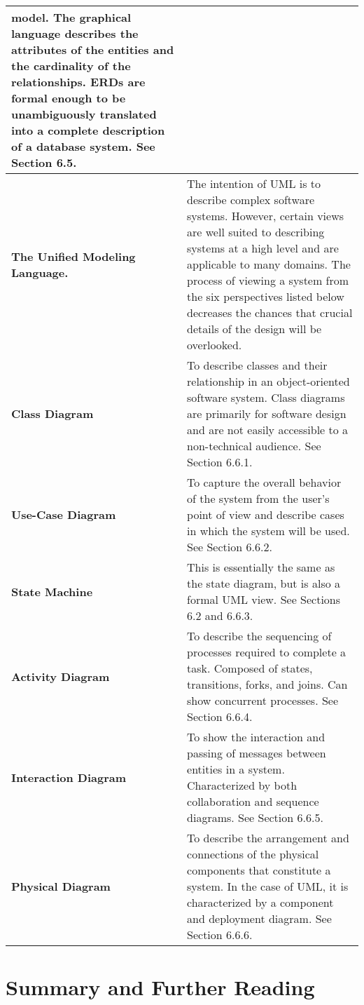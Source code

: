 \begin{table}
\begin{tabular}{|l|m{10cm}|}
model. The graphical language describes the attributes of the entities
and the cardinality of the relationships. ERDs are formal enough to be
unambiguously translated into a complete description of a database
system. See Section 6.5. \\  \hline
\textbf{The Unified Modeling Language.} & The intention of UML is to
describe complex software systems. However, certain views are well
suited to describing systems at a high level and are applicable to many
domains. The process of viewing a system from the six perspectives
listed below decreases the chances that crucial details of the design
will be overlooked. \\  \hline
\textbf{Class Diagram} & To describe classes and their relationship in
an object-oriented software system. Class diagrams are primarily for
software design and are not easily accessible to a non-technical
audience. See Section 6.6.1. \\ \hline
\textbf{Use-Case Diagram} &  To capture the overall behavior of the system from
the user's point of view and describe cases in which the system will be
used. See Section 6.6.2. \\  \hline
\textbf{State Machine} & This is essentially the same as the state
diagram, but is also a formal UML view. See Sections 6.2 and 6.6.3. \\  \hline
\textbf{Activity Diagram} &  To describe the sequencing of processes required to
complete a task. Composed of states, transitions, forks, and joins. Can
show concurrent processes. See Section 6.6.4. \\  \hline
\textbf{Interaction Diagram} & To show the interaction and passing of messages
between entities in a system. Characterized by both collaboration and
sequence diagrams. See Section 6.6.5. \\  \hline
\textbf{Physical Diagram} &  To describe the arrangement and connections of the
physical components that constitute a system. In the case of UML, it is
characterized by a component and deployment diagram. See Section
6.6.6. \\  \hline
\end{tabular}
\end{table}

\section{Summary and Further Reading}
\label{section:summary-and-further-reading}

